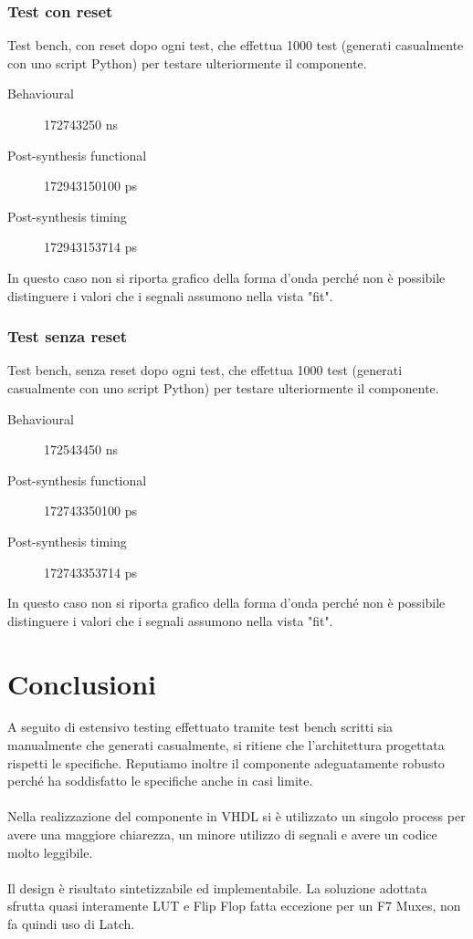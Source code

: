 \documentclass{article}
\begin{document}
\subsubsection{Test con reset}
Test bench, con reset dopo ogni test, che effettua 1000 test (generati casualmente con uno script Python) per testare ulteriormente il componente.
\begin{description}
	\item[Behavioural] 172743250 ns
	\item[Post-synthesis functional] 172943150100 ps
	\item[Post-synthesis timing] 172943153714 ps
\end{description}
In questo caso non si riporta grafico della forma d'onda perché non è possibile distinguere i valori che i segnali assumono nella vista "fit".

\subsubsection{Test senza reset}
Test bench, senza reset dopo ogni test, che effettua 1000 test (generati casualmente con uno script Python) per testare ulteriormente il componente.
\begin{description}
	\item[Behavioural] 172543450 ns
	\item[Post-synthesis functional] 172743350100 ps
	\item[Post-synthesis timing] 172743353714 ps
\end{description}
In questo caso non si riporta grafico della forma d'onda perché non è possibile distinguere i valori che i segnali assumono nella vista "fit".
\pagebreak

\section{Conclusioni}
A seguito di estensivo testing effettuato tramite test bench scritti sia manualmente che generati casualmente, si ritiene che l’architettura progettata rispetti le specifiche. Reputiamo inoltre il componente adeguatamente robusto perché ha soddisfatto le specifiche anche in casi limite.
\\
\\
Nella realizzazione del componente in VHDL si è utilizzato un singolo process per avere una maggiore chiarezza, un minore utilizzo di segnali e avere un codice molto leggibile.
\\
\\
Il design è risultato sintetizzabile ed implementabile. La soluzione adottata sfrutta quasi interamente LUT e Flip Flop fatta eccezione per un F7 Muxes, non fa quindi uso di Latch.
\\

\end{document}
